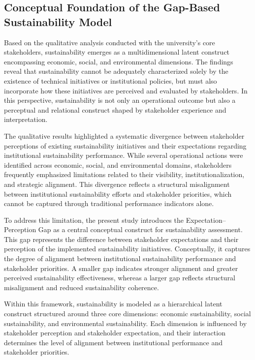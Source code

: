 \documentclass[11pt,a4paper]{article}
\begin{document}
\subsection{Conceptual Foundation of the Gap-Based Sustainability Model}

Based on the qualitative analysis conducted with the university’s core stakeholders, sustainability emerges as a multidimensional latent construct encompassing economic, social, and environmental dimensions. The findings reveal that sustainability cannot be adequately characterized solely by the existence of technical initiatives or institutional policies, but must also incorporate how these initiatives are perceived and evaluated by stakeholders. In this perspective, sustainability is not only an operational outcome but also a perceptual and relational construct shaped by stakeholder experience and interpretation.

The qualitative results highlighted a systematic divergence between stakeholder perceptions of existing sustainability initiatives and their expectations regarding institutional sustainability performance. While several operational actions were identified across economic, social, and environmental domains, stakeholders frequently emphasized limitations related to their visibility, institutionalization, and strategic alignment. This divergence reflects a structural misalignment between institutional sustainability efforts and stakeholder priorities, which cannot be captured through traditional performance indicators alone.

To address this limitation, the present study introduces the Expectation--Perception Gap as a central conceptual construct for sustainability assessment. This gap represents the difference between stakeholder expectations and their perception of the implemented sustainability initiatives. Conceptually, it captures the degree of alignment between institutional sustainability performance and stakeholder priorities. A smaller gap indicates stronger alignment and greater perceived sustainability effectiveness, whereas a larger gap reflects structural misalignment and reduced sustainability coherence.

Within this framework, sustainability is modeled as a hierarchical latent construct structured around three core dimensions: economic sustainability, social sustainability, and environmental sustainability. Each dimension is influenced by stakeholder perception and stakeholder expectation, and their interaction determines the level of alignment between institutional performance and stakeholder priorities.
\end{document}
